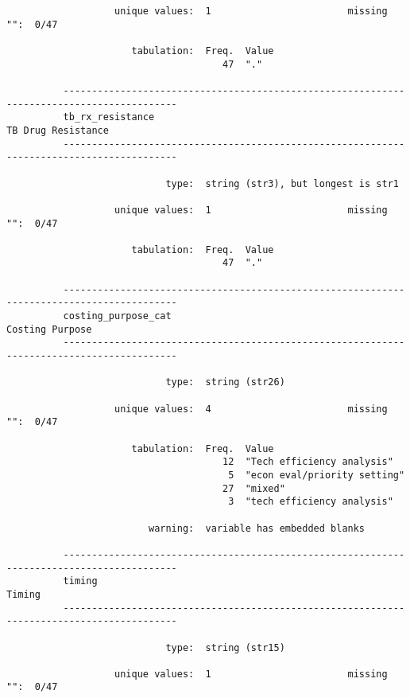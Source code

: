 \documentclass{article}
\begin{document}
\begin{verbatim}
                   unique values:  1                        missing "":  0/47
          
                      tabulation:  Freq.  Value
                                      47  "."
          
          ------------------------------------------------------------------------------------------
          tb_rx_resistance                                                        TB Drug Resistance
          ------------------------------------------------------------------------------------------
          
                            type:  string (str3), but longest is str1
          
                   unique values:  1                        missing "":  0/47
          
                      tabulation:  Freq.  Value
                                      47  "."
          
          ------------------------------------------------------------------------------------------
          costing_purpose_cat                                                        Costing Purpose
          ------------------------------------------------------------------------------------------
          
                            type:  string (str26)
          
                   unique values:  4                        missing "":  0/47
          
                      tabulation:  Freq.  Value
                                      12  "Tech efficiency analysis"
                                       5  "econ eval/priority setting"
                                      27  "mixed"
                                       3  "tech efficiency analysis"
          
                         warning:  variable has embedded blanks
          
          ------------------------------------------------------------------------------------------
          timing                                                                              Timing
          ------------------------------------------------------------------------------------------
          
                            type:  string (str15)
          
                   unique values:  1                        missing "":  0/47
          

\end{verbatim}
\end{document}
